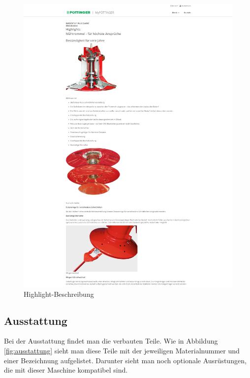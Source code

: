 \begin{figure}[H]
	\centerline{
		\includegraphics[width=1\textwidth, frame]{./grafiken/erm_detailansicht_highlights_beschreibung.PNG}
	}
	\vskip0pt
	\caption{Highlight-Beschreibung} \label{fig:highlightbeschreibung}
\end{figure}

\subsection{Ausstattung}

Bei der Ausstattung findet man die verbauten Teile. Wie in Abbildung \ref{fig:ausstattung} sieht man diese Teile mit der jeweiligen Materialnummer und einer Bezeichnung aufgelistet. Darunter sieht man noch optionale Ausrüstungen, die mit dieser Maschine kompatibel sind.

